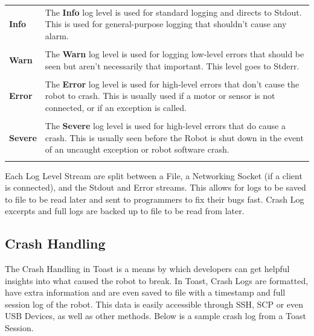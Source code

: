 \documentclass[a4paper,12pt]{article}
\begin{document}
\begin{tabular}{p{2cm}p{12.5cm}}
	\textbf{Info} &
		The \textbf{Info} log level is used for standard logging and directs to Stdout. This is used for general-purpose logging that shouldn't cause any alarm.\\\\
	\textbf{Warn} &
		The \textbf{Warn} log level is used for logging low-level errors that should be seen but aren't necessarily that important. This level goes to Stderr.\\\\
	\textbf{Error} &
		The \textbf{Error} log level is used for high-level errors that don't cause the robot to crash. This is usually used if a motor or sensor is not connected, or if an exception is called.\\\\
	\textbf{Severe} &
		The \textbf{Severe} log level is used for high-level errors that do cause a crash. This is usually seen before the Robot is shut down in the event of an uncaught exception or robot software crash.\\\\
\end{tabular}

Each Log Level Stream are split between a File, a Networking Socket (if a client is connected), and the Stdout and Error streams. This allows for logs to be saved to file to be read later and sent to programmers to fix their bugs fast. Crash Log excerpts and full logs are backed up to file to be read from later.

\subsection{Crash Handling}
The Crash Handling in Toast is a means by which developers can get helpful insights into what caused the robot to break. In Toast, Crash Logs are formatted, have extra information and are even saved to file with a timestamp and full session log of the robot. This data is easily accessible through SSH, SCP or even USB Devices, as well as other methods. Below is a sample crash log from a Toast Session.
\end{document}
